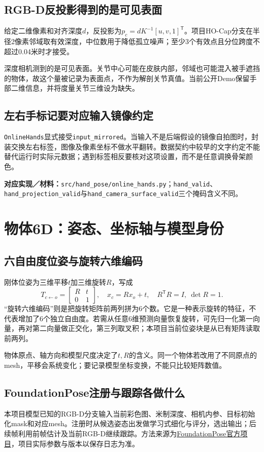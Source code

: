 \documentclass[11pt,a4paper,UTF8,fontset=fandol]{ctexart}
\newcommand{\code}[1]{{\small\nolinkurl{#1}}}
\newcommand{\where}[1]{\par{\small\color{green}\textbf{对应实现／材料：}#1}\par}
\begin{document}
\subsection{RGB-D反投影得到的是可见表面}
给定二维像素和对齐深度$d$，反投影为$p_c=dK^{-1}[u,v,1]^\mathsf T$。项目HO-Cap分支在半径2像素邻域取有效深度，中位数用于降低孤立噪声；至少3个有效点且分位跨度不超过0.04米时才接受。

深度相机测到的是可见表面。关节中心可能在皮肤内部，邻域也可能混入被手遮挡的物体，故这个量被记录为表面点，不作为解剖关节真值。当前公开Demo保留手部二维信息，并将度量关节三维设为缺失。

\subsection{左右手标记要对应输入镜像约定}
\code{OnlineHands}显式接受\code{input_mirrored}。当输入不是后端假设的镜像自拍图时，封装交换左右标签，图像及像素坐标不做水平翻转。数据契约中较早的文字约定不能替代运行时实际元数据；遇到标签相反要核对这项设置，而不是任意调换骨架颜色。
\where{\code{src/hand_pose/online_hands.py}；\code{hand_valid}、\code{hand_projection_valid}与\code{hand_camera_surface_valid}三个掩码含义不同。}

\section{物体6D：姿态、坐标轴与模型身份}
\subsection{六自由度位姿与旋转六维编码}
刚体位姿为三维平移$t$加三维旋转$R$，写成
\[
T_{c\leftarrow o}=\begin{bmatrix}R&t\\0&1\end{bmatrix},\quad x_c=Rx_o+t,
\quad R^\mathsf TR=I,\ \det R=1.
\]
“旋转六维编码”则是把旋转矩阵前两列拼为6个数。它是一种表示旋转的特征，不代表增加了6个独立自由度。若需从任意6维预测向量恢复旋转，可先归一化第一向量，再对第二向量做正交化，第三列取叉积；本项目当前位姿块是从已有矩阵读取前两列。

物体原点、轴方向和模型尺度决定了$t,R$的含义。同一个物体若改用了不同原点的mesh，平移会系统变化；要记录模型坐标变换，不能只比较矩阵数值。

\subsection{FoundationPose注册与跟踪各做什么}
本项目模型已知的RGB-D分支输入当前彩色图、米制深度、相机内参、目标初始化mask和对应mesh。注册时从候选姿态出发做学习式细化与评分，选出输出；后续帧利用前帧估计及当前RGB-D继续跟踪。方法来源为\href{https://nvlabs.github.io/FoundationPose/}{FoundationPose官方项目}，项目实际参数与版本以保存日志为准。
\end{document}
